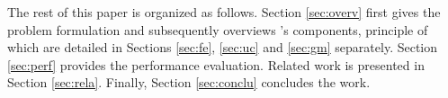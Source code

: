  The rest of this paper is organized as follows.
Section \ref{sec:overv} first gives the problem formulation and subsequently overviews \sys{}'s components, principle of which are detailed in Sections \ref{sec:fe}, \ref{sec:uc} and \ref{sec:gm} separately.
Section \ref{sec:perf} provides the performance evaluation.
Related work is presented in Section \ref{sec:rela}.
Finally, Section \ref{sec:conclu} concludes the work.











